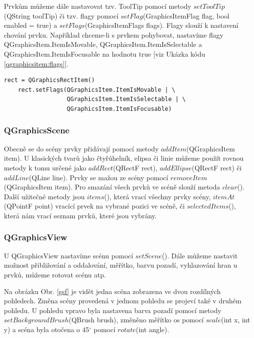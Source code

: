 Prvkům můžeme dále nastavovat tzv. ToolTip pomocí metody $setToolTip$(QString toolTip) či tzv. flagy pomocí $setFlag$(GraphicsItemFlag flag, bool enabled = true) a $setFlags$(GraphicsItemFlags flags). Flagy slouží k nastavení chování prvku. Například chceme-li s prvkem pohybovat, nastavíme flagy QGraphicsItem.ItemIsMovable, QGraphicsItem.ItemIsSelectable a QGraphicsItem.ItemIsFocusable na hodnotu true [viz Ukázka kódu \ref{qgraphicsitem:flags}].\\
 
\begin{lstlisting}[label=qgraphicsitem:flags,caption={Nastavení flagů u QGraphicsRectItem}, morekeywords={QGraphicsItem, QGraphicsRectItem}] 
	rect = QGraphicsRectItem()
	rect.setFlags(QGraphicsItem.ItemIsMovable | \
				  QGraphicsItem.ItemIsSelectable | \
				  QGraphicsItem.ItemIsFocusable)
\end{lstlisting}
 
\subsubsection*{QGraphicsScene}
Obecně se do scény prvky přidávají pomocí metody $addItem$(QGraphicsItem item). U klasických tvarů jako čtyřúhelník, elipsa či linie můžeme použít rovnou metody k tomu určené jako $addRect$(QRectF rect), $addEllipse$(QRectF rect) či $addLine$(QLine line). Prvky se mažou ze scény pomocí $removeItem$(QGraphicsItem item). Pro smazání všech prvků ve scéně slouží metoda $clear$(). Další užitečné metody jsou $items$(), která vrací všechny prvky scény, $itemAt$(QPointF point) vracící prvek na vybrané pozici ve scéně, či $selectedItems$(), která nám vrací seznam prvků, které jsou vybrány.

\subsubsection*{QGraphicsView}
U QGraphicsView nastavíme scénu pomocí $setScene$(). Dále můžeme nastavit možnost přibližování a oddalování, měřítko, barvu pozadí, vyhlazování hran u prvků, můžeme rotovat scénu atp.

Na obrázku Obr. \ref{gsf} je vidět jedna scéna zobrazena ve dvou rozdílných pohledech. Změna scény provedená v jednom pohledu se projeví také v druhém pohledu. U pohledu vpravo byla nastavena barva pozadí pomocí metody $setBackgroundBrush$(QBrush brush), změněno měřítko os pomocí $scale$(int x, int y) a scéna byla otočena o 45$^\circ$ pomocí $rotate$(int angle). \\

